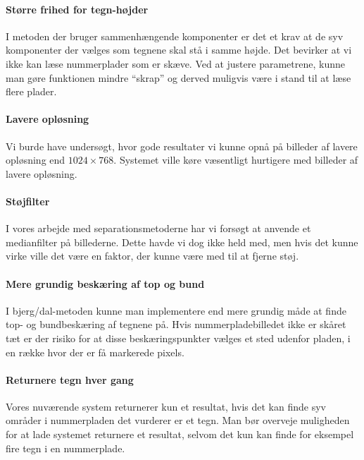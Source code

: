 \paragraph{Større frihed for tegn-højder}
I metoden der bruger sammenhængende komponenter er det et krav at de syv komponenter der vælges som tegnene skal stå i samme højde. Det bevirker at vi ikke kan læse nummerplader som er skæve. Ved at justere parametrene, kunne man gøre funktionen mindre ``skrap'' og derved muligvis være i stand til at læse flere plader.

\paragraph{Lavere opløsning}
Vi burde have undersøgt, hvor gode resultater vi kunne opnå på billeder af lavere opløsning end $1024 \times 768$. Systemet ville køre væsentligt hurtigere med billeder af lavere opløsning.


\paragraph{Støjfilter}
I vores arbejde med separationsmetoderne har vi forsøgt at anvende et medianfilter på billederne. Dette havde vi dog ikke held med, men hvis det kunne virke ville det være en faktor, der kunne være med til at fjerne støj.

\paragraph{Mere grundig beskæring af top og bund}
I bjerg/dal-metoden kunne man implementere end mere grundig måde at finde top- og bundbeskæring af tegnene på. Hvis nummerpladebilledet ikke er skåret tæt er der risiko for at disse beskæringspunkter vælges et sted udenfor pladen, i en række hvor der er få markerede pixels.

\paragraph{Returnere tegn hver gang}
Vores nuværende system returnerer kun et resultat, hvis det kan finde syv områder i nummerpladen det vurderer er et tegn. Man bør overveje muligheden for at lade systemet returnere et resultat, selvom det kun kan finde for eksempel fire tegn i en nummerplade.


